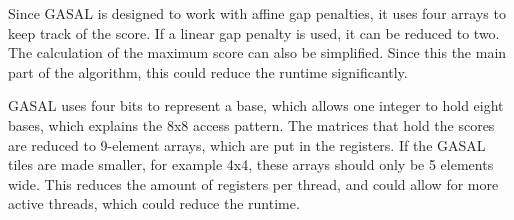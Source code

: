 \documentclass[../thesis.tex]{subfiles}
\begin{document}
Since GASAL is designed to work with affine gap penalties, it uses four arrays to keep track of the score.
If a linear gap penalty is used, it can be reduced to two.
The calculation of the maximum score can also be simplified.
Since this the main part of the algorithm, this could reduce the runtime significantly.

GASAL uses four bits to represent a base, which allows one integer to hold eight bases, which explains the 8x8 access pattern.
The matrices that hold the scores are reduced to 9-element arrays, which are put in the registers.
If the GASAL tiles are made smaller, for example 4x4, these arrays should only be 5 elements wide.
This reduces the amount of registers per thread, and could allow for more active threads, which could reduce the runtime.
\end{document}
